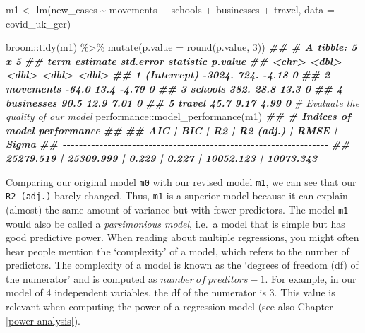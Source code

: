 \documentclass[
]{book}
\newenvironment{Shaded}{\begin{snugshade}}{\end{snugshade}}
\newcommand{\AttributeTok}[1]{\textcolor[rgb]{0.77,0.63,0.00}{#1}}
\newcommand{\CommentTok}[1]{\textcolor[rgb]{0.56,0.35,0.01}{\textit{#1}}}
\newcommand{\DecValTok}[1]{\textcolor[rgb]{0.00,0.00,0.81}{#1}}
\newcommand{\DocumentationTok}[1]{\textcolor[rgb]{0.56,0.35,0.01}{\textbf{\textit{#1}}}}
\newcommand{\FunctionTok}[1]{\textcolor[rgb]{0.00,0.00,0.00}{#1}}
\newcommand{\NormalTok}[1]{#1}
\newcommand{\OtherTok}[1]{\textcolor[rgb]{0.56,0.35,0.01}{#1}}
\newcommand{\SpecialCharTok}[1]{\textcolor[rgb]{0.00,0.00,0.00}{#1}}
\begin{document}
\begin{Shaded}
\begin{Highlighting}[]
\NormalTok{m1 }\OtherTok{\textless{}{-}} \FunctionTok{lm}\NormalTok{(new\_cases }\SpecialCharTok{\textasciitilde{}}\NormalTok{ movements }\SpecialCharTok{+}\NormalTok{ schools }\SpecialCharTok{+}\NormalTok{ businesses }\SpecialCharTok{+}\NormalTok{ travel,}
         \AttributeTok{data =}\NormalTok{ covid\_uk\_ger)}

\NormalTok{broom}\SpecialCharTok{::}\FunctionTok{tidy}\NormalTok{(m1) }\SpecialCharTok{\%\textgreater{}\%}
  \FunctionTok{mutate}\NormalTok{(}\AttributeTok{p.value =} \FunctionTok{round}\NormalTok{(p.value, }\DecValTok{3}\NormalTok{))}
\DocumentationTok{\#\# \# A tibble: 5 x 5}
\DocumentationTok{\#\#   term        estimate std.error statistic p.value}
\DocumentationTok{\#\#   \textless{}chr\textgreater{}          \textless{}dbl\textgreater{}     \textless{}dbl\textgreater{}     \textless{}dbl\textgreater{}   \textless{}dbl\textgreater{}}
\DocumentationTok{\#\# 1 (Intercept)  {-}3024.     724.       {-}4.18       0}
\DocumentationTok{\#\# 2 movements      {-}64.0     13.4      {-}4.79       0}
\DocumentationTok{\#\# 3 schools        382.      28.8      13.3        0}
\DocumentationTok{\#\# 4 businesses      90.5     12.9       7.01       0}
\DocumentationTok{\#\# 5 travel          45.7      9.17      4.99       0}
\CommentTok{\# Evaluate the quality of our model}
\NormalTok{performance}\SpecialCharTok{::}\FunctionTok{model\_performance}\NormalTok{(m1)}
\DocumentationTok{\#\# \# Indices of model performance}
\DocumentationTok{\#\# }
\DocumentationTok{\#\# AIC       |       BIC |    R2 | R2 (adj.) |      RMSE |     Sigma}
\DocumentationTok{\#\# {-}{-}{-}{-}{-}{-}{-}{-}{-}{-}{-}{-}{-}{-}{-}{-}{-}{-}{-}{-}{-}{-}{-}{-}{-}{-}{-}{-}{-}{-}{-}{-}{-}{-}{-}{-}{-}{-}{-}{-}{-}{-}{-}{-}{-}{-}{-}{-}{-}{-}{-}{-}{-}{-}{-}{-}{-}{-}{-}{-}{-}{-}{-}{-}{-}}
\DocumentationTok{\#\# 25279.519 | 25309.999 | 0.229 |     0.227 | 10052.123 | 10073.343}
\end{Highlighting}
\end{Shaded}

Comparing our original model \texttt{m0} with our revised model \texttt{m1}, we can see that our \texttt{R2\ (adj.)} barely changed. Thus, \texttt{m1} is a superior model because it can explain (almost) the same amount of variance but with fewer predictors. The model \texttt{m1} would also be called a \emph{parsimonious model}, i.e.~a model that is simple but has good predictive power. When reading about multiple regressions, you might often hear people mention the `complexity' of a model, which refers to the number of predictors. The complexity of a model is known as the `degrees of freedom (df) of the numerator' and is computed as \(number\ of\ preditors - 1\). For example, in our model of 4 independent variables, the df of the numerator is 3. This value is relevant when computing the power of a regression model (see also Chapter \ref{power-analysis}).
\end{document}
